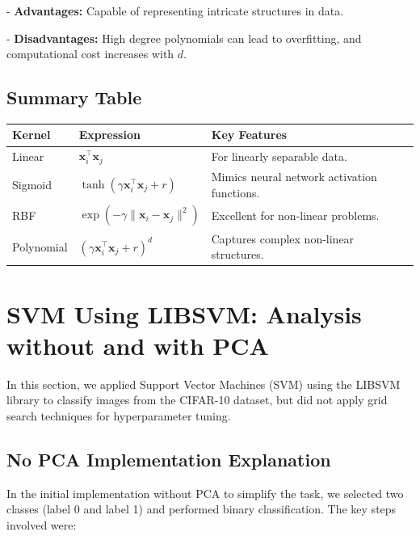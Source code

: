 \documentclass[lettersize,journal]{IEEEtran}
\begin{document}
\hspace{-0.33cm}- \textbf{Advantages:} Capable of representing intricate structures in data.

\vspace{0.1cm}

\hspace{-0.33cm}- \textbf{Disadvantages:} High degree polynomials can lead to overfitting, and computational cost increases with $d$.

\subsection{\textbf{Summary Table}}
\begin{center}
\begin{tabular}{|m{}|>{\centering\arraybackslash}m{}|m{}|}
\hline
\textbf{Kernel} & \textbf{Expression} & \textbf{Key Features} \\
\hline
Linear & $\mathbf{x}_i^\top \mathbf{x}_j$ & For linearly separable data. \\
\hline
Sigmoid & $\tanh(\gamma \mathbf{x}_i^\top \mathbf{x}_j + r)$ & Mimics neural network activation functions. \\
\hline
RBF & $\exp\left(-\gamma \|\mathbf{x}_i - \mathbf{x}_j\|^2\right)$ & Excellent for non-linear problems. \\
\hline
Polynomial & $(\gamma \mathbf{x}_i^\top \mathbf{x}_j + r)^d$ & Captures complex non-linear structures. \\
\hline
\end{tabular}
\end{center}

\vspace{0.5cm}

\section{\textbf{SVM Using LIBSVM: Analysis without and with PCA}}
In this section, we applied Support Vector Machines (SVM) using the LIBSVM library to classify images from the CIFAR-10 dataset, but did not apply grid search techniques for hyperparameter tuning.

\subsection{\textbf{No PCA Implementation Explanation}}
In the initial implementation without PCA to simplify the task, we selected two classes (label 0 and label 1) and performed binary classification.  The key steps involved were:
\end{document}

